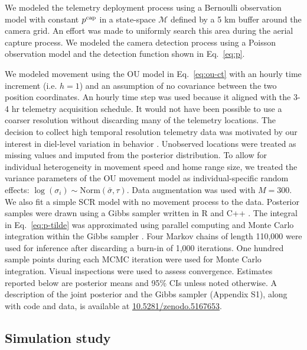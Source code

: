 \documentclass[12pt]{article}
\begin{document}
We modeled the telemetry deployment process using a Bernoulli
observation model with constant $p^{\rm cap}$ in a state-space
$\mathcal M$ defined by a 5 km buffer around the camera grid.
An effort was made to uniformly search this area during the aerial
capture process. We modeled the camera detection process using a
Poisson observation model and the detection function shown in Eq.~\ref{eq:p}. 

We modeled movement using the OU model in Eq.~\ref{eq:ou-ct} with an
hourly time increment (i.e. $h=1$) and an assumption of no covariance
between the two position coordinates. An hourly time step was used
because it aligned with the 3-4 hr telemetry acquisition schedule. It
would not have been possible to use a coarser resolution without
discarding many of the telemetry locations.
The decision to collect high temporal resolution telemetry data was
motivated by our interest in diel-level variation in behavior
\citep{crawford_etal:2019}. Unobserved locations were treated as
missing values and imputed from the posterior distribution.
To allow for individual heterogeneity in
movement speed and home range size, we treated the variance parameters
of the OU movement model as individual-specific random effects:
$\log(\sigma_i) \sim \mathrm{Norm}(\bar{\sigma}, \tau)$. Data
augmentation was used with $M=300$. 
We also fit a simple SCR model with no movement process to the data. 
Posterior samples were drawn using a Gibbs sampler written in R and C++ 
\citep{eddelbuettel_sanderson:2014,R:2021}. 
The integral in Eq.~\ref{eq:p-tilde} was approximated using parallel
computing and Monte Carlo integration within the Gibbs
sampler \citep{bonner_schofield:2014}.
Four Markov chains of length 110,000 were used for inference after
discarding a burn-in of 1,000 iterations. One hundred sample points
during each MCMC iteration were used for Monte Carlo
integration. Visual inspections were used to assess
convergence. Estimates reported below are posterior means and 95\% CIs
unless noted otherwise. A description of the joint posterior and the
Gibbs sampler (Appendix S1), along with code and data, is available at
\url{10.5281/zenodo.5167653}.  

\subsection{Simulation study}
\end{document}

